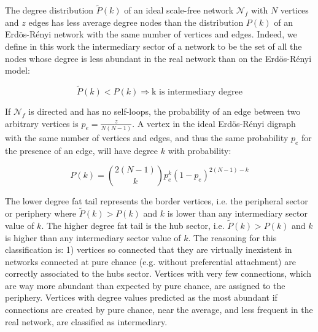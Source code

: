 \documentclass[%
	aip,
	jmp,%
	amsmath,amssymb,
	reprint,%
]{revtex4-1}
\begin{document}
The degree distribution $\widetilde{P}(k)$ of an ideal
scale-free network $\mathcal{N}_f$ with $N$ vertices and $z$ edges has less
average degree nodes than the distribution $P(k)$ of an Erd\"os-R\'enyi
network with the same number of vertices and edges. Indeed, we define in this work the intermediary sector of a network to be the set of all the nodes whose degree is less abundant in the real network than on the Erd\"os-R\'enyi model:

\begin{equation}\label{criterio}
	\widetilde{P}(k)<P(k) \Rightarrow \text{k is intermediary degree}
\end{equation}

If $\mathcal{N}_f$ is directed and has no self-loops, the probability
of an edge between two arbitrary vertices is $p_e=\frac{z}{N(N-1)}$.
A vertex in the ideal Erd\"os-R\'enyi digraph with the same number of vertices and edges, and thus the same probability $p_e$ for the presence of an edge, will have degree $k$ with probability:

\begin{equation}
	P(k)=\binom{2(N-1)}{k}p_e^k(1-p_e)^{2(N-1)-k}
\end{equation}

The lower degree fat tail represents the border vertices, i.e. the peripheral sector or periphery where $\widetilde{P}(k)>P(k)$ and $k$ is lower than any intermediary sector value of $k$. The higher degree fat tail is the hub sector, i.e. $\widetilde{P}(k)>P(k)$ and $k$ is higher than any intermediary sector value of $k$. The reasoning for this classification is: 1) vertices so connected that they are virtually inexistent in networks connected at pure chance (e.g. without preferential attachment) are correctly associated to the hubs sector. Vertices with very few connections, which are way more abundant than expected by pure chance, are assigned to the periphery. Vertices with degree values predicted as the most abundant if connections are created by pure chance, near the average, and less frequent in the real network, are classified as intermediary.
\end{document}
